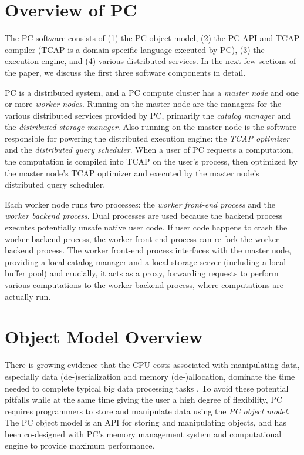 
\section{Overview of PC}

The PC software consists of 
(1) the PC object model, (2) the PC API and TCAP compiler (TCAP is a domain-specific language executed by PC),
(3) the execution engine, and (4) various distributed services.  In the next few sections of the paper, 
we discuss the first three software components in detail.

PC is a distributed system, and a PC compute cluster has a \emph{master node} and one or more \emph{worker nodes}.
Running on the master node are the managers for the various distributed services provided by PC, primarily 
the \emph{catalog manager} and the \emph{distributed storage manager}.  Also running on the master
node is the software responsible for powering the distributed execution engine: the \emph{TCAP optimizer} and
the \emph{distributed query scheduler}.  
When a user of PC requests a computation, the computation is compiled into TCAP on the user's process, then optimized
by the master node's TCAP optimizer and executed by the master node's distributed query scheduler.

Each worker node runs two processes: the \emph{worker front-end process} and the \emph{worker backend process}.
Dual processes are used because the backend process
executes potentially unsafe native user code.
If
user code happens to crash the worker backend process, the worker 
front-end process can re-fork the worker
backend process.  
The worker front-end process interfaces with the master node, providing a local catalog manager and a local storage server (including
a local buffer pool)
and crucially, it acts as a proxy, forwarding requests to perform various computations to the worker backend process, where
computations are actually run.

\section{Object Model Overview}

There is growing evidence that the CPU costs associated with manipulating data, especially data (de-)serialization and memory 
(de-)allocation,  
dominate the time needed to complete typical big data processing tasks
\cite{ousterhout2015making, shi2015clash}.
To avoid these potential pitfalls while at the same time giving the user a high degree of flexibility,
PC requires programmers to store and manipulate data using the \emph{PC object model}.
The PC object model is an API for storing and manipulating objects, and has been co-designed with PC's memory management system and computational engine to provide
maximum performance.  

